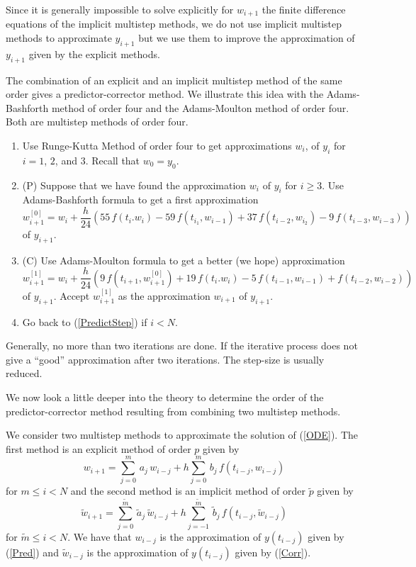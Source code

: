 Since it is generally impossible to solve explicitly for $w_{i+1}$ the
finite difference equations of the implicit multistep methods, we do not use
implicit multistep methods to approximate $y_{i+1}$ but we use them
to improve the approximation of $y_{i+1}$ given by the explicit
methods.

The combination of an explicit and an implicit multistep method of
the same order gives a predictor-corrector method.  We illustrate this
idea with the Adams-Bashforth method of order four and the
Adams-Moulton method of order four.  Both are multistep methods of
order four.

\begin{algo}
\begin{enumerate}
\item Use Runge-Kutta Method of order four to get approximations $w_i$,
of $y_i$ for $i=1$, $2$, and $3$.  Recall that $w_0 = y_0$.
\item (P) Suppose that we have found the approximation $w_i$ of $y_i$
for $i\geq 3$.  Use Adams-Bashforth formula to get a first approximation
\[
w_{i+1}^{[0]} = w_i + \frac{h}{24} \left( 55 \, f(t_i.w_i) - 59 \,
f(t_{i_1},w_{i-1}) + 37\, f(t_{i-2},w_{i_2}) - 9 \,f(t_{i-3},w_{i-3}) \right)
\]
of $y_{i+1}$. \label{PredictStep}
\item (C) Use Adams-Moulton formula to get a better (we hope)
approximation
\[
w_{i+1}^{[1]} = w_i + \frac{h}{24} \left( 9\, f\left(t_{i+1},w_{i+1}^{[0]}\right)
+ 19 \,f(t_i.w_i)  - 5 \,f(t_{i-1},w_{i-1}) + f(t_{i-2},w_{i-2})\right)
\]
of $y_{i+1}$.  Accept $\displaystyle w_{i+1}^{[1]}$ as the
approximation $w_{i+1}$ of $y_{i+1}$.
\item Go back to (\ref{PredictStep}) if $i<N$.
\end{enumerate}
\end{algo}

\begin{rmk}
Generally, no more than two iterations are done.  If the iterative
process does not give a ``good'' approximation after two
iterations.  The step-size is usually reduced.
\end{rmk}

We now look a little deeper into the theory to determine the order of
the predictor-corrector method resulting from combining two multistep
methods.

We consider two multistep methods to approximate the solution of
(\ref{ODE}).  The first method is an explicit method of order $p$
given by
\begin{equation} \label{Pred}
w_{i+1} = \sum_{j=0}^m\,a_j\,w_{i-j} + h \sum_{j=0}^m\,b_j\,f(t_{i-j},w_{i-j})
\end{equation}
for $m\leq i < N$ and the second method is an implicit method of order
$\tilde{p}$ given by
\begin{equation} \label{Corr}
\tilde{w}_{i+1} = \sum_{j=0}^{\tilde{m}}\,\tilde{a}_j\,\tilde{w}_{i-j}
+ h \sum_{j=-1}^{\tilde{m}}\,\tilde{b}_j\,f(t_{i-j},\tilde{w}_{i-j})
\end{equation}
for $\tilde{m} \leq i < N$.  We have that
$w_{i-j}$ is the approximation of $y(t_{i-j})$ given by
(\ref{Pred}) and $\tilde{w}_{i-j}$ is the approximation of
$y(t_{i-j})$ given by (\ref{Corr}).

